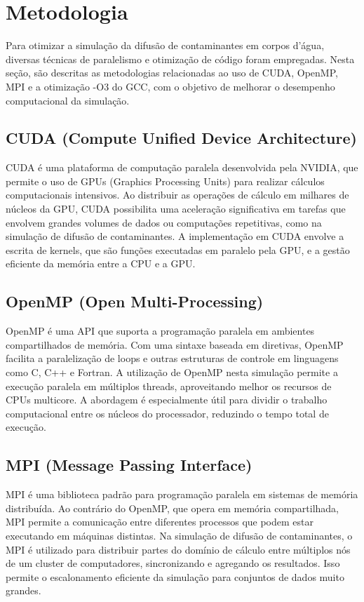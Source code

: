 \section{Metodologia}

Para otimizar a simulação da difusão de contaminantes em corpos d'água, diversas técnicas de paralelismo e otimização de código foram empregadas. Nesta seção, são descritas as metodologias relacionadas ao uso de CUDA, OpenMP, MPI e a otimização -O3 do GCC, com o objetivo de melhorar o desempenho computacional da simulação.

\subsection{CUDA (Compute Unified Device Architecture)}

CUDA é uma plataforma de computação paralela desenvolvida pela NVIDIA, que permite o uso de GPUs (Graphics Processing Units) para realizar cálculos computacionais intensivos. Ao distribuir as operações de cálculo em milhares de núcleos da GPU, CUDA possibilita uma aceleração significativa em tarefas que envolvem grandes volumes de dados ou computações repetitivas, como na simulação de difusão de contaminantes. A implementação em CUDA envolve a escrita de kernels, que são funções executadas em paralelo pela GPU, e a gestão eficiente da memória entre a CPU e a GPU.

\subsection{OpenMP (Open Multi-Processing)}

OpenMP é uma API que suporta a programação paralela em ambientes compartilhados de memória. Com uma sintaxe baseada em diretivas, OpenMP facilita a paralelização de loops e outras estruturas de controle em linguagens como C, C++ e Fortran. A utilização de OpenMP nesta simulação permite a execução paralela em múltiplos threads, aproveitando melhor os recursos de CPUs multicore. A abordagem é especialmente útil para dividir o trabalho computacional entre os núcleos do processador, reduzindo o tempo total de execução.

\subsection{MPI (Message Passing Interface)}

MPI é uma biblioteca padrão para programação paralela em sistemas de memória distribuída. Ao contrário do OpenMP, que opera em memória compartilhada, MPI permite a comunicação entre diferentes processos que podem estar executando em máquinas distintas. Na simulação de difusão de contaminantes, o MPI é utilizado para distribuir partes do domínio de cálculo entre múltiplos nós de um cluster de computadores, sincronizando e agregando os resultados. Isso permite o escalonamento eficiente da simulação para conjuntos de dados muito grandes.

